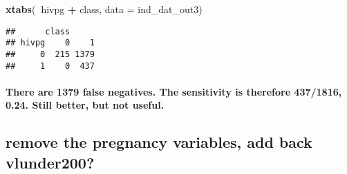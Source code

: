 \documentclass[
]{article}
\newenvironment{Shaded}{\begin{snugshade}}{\end{snugshade}}
\newcommand{\DataTypeTok}[1]{\textcolor[rgb]{0.13,0.29,0.53}{#1}}
\newcommand{\KeywordTok}[1]{\textcolor[rgb]{0.13,0.29,0.53}{\textbf{#1}}}
\newcommand{\NormalTok}[1]{#1}
\newcommand{\OperatorTok}[1]{\textcolor[rgb]{0.81,0.36,0.00}{\textbf{#1}}}
\newcommand{\OtherTok}[1]{\textcolor[rgb]{0.56,0.35,0.01}{#1}}
\newcommand{\StringTok}[1]{\textcolor[rgb]{0.31,0.60,0.02}{#1}}
\let\oldparagraph\paragraph
\renewcommand{\paragraph}[1]{\oldparagraph{#1}\mbox{}}
\begin{document}
\begin{Shaded}
\end{Shaded}

\begin{Shaded}
\begin{Highlighting}[]
\KeywordTok{xtabs}\NormalTok{(}\OperatorTok{~}\NormalTok{hivpg }\OperatorTok{+}\StringTok{ }\NormalTok{class, }\DataTypeTok{data =}\NormalTok{ ind_dat_out3)}
\end{Highlighting}
\end{Shaded}

\begin{verbatim}
##      class
## hivpg    0    1
##     0  215 1379
##     1    0  437
\end{verbatim}

\hypertarget{there-are-1379-false-negatives.-the-sensitivity-is-therefore-4371816-0.24.-still-better-but-not-useful.}{%
\paragraph{There are 1379 false negatives. The sensitivity is therefore
437/1816, 0.24. Still better, but not
useful.}\label{there-are-1379-false-negatives.-the-sensitivity-is-therefore-4371816-0.24.-still-better-but-not-useful.}}

\hypertarget{remove-the-pregnancy-variables-add-back-vlunder200}{%
\subsection{remove the pregnancy variables, add back
vlunder200?}\label{remove-the-pregnancy-variables-add-back-vlunder200}}
\end{document}
